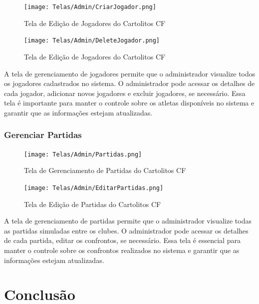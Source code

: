 \documentclass[12pt]{article}
\begin{document}
\begin{figure}[H]
  \centering
  \texttt{[image: Telas/Admin/CriarJogador.png]}
  \caption{Tela de Edição de Jogadores do Cartolitos CF}
  \label{fig:editar_jogador}
\end{figure}

\begin{figure}[H]
  \centering
  \texttt{[image: Telas/Admin/DeleteJogador.png]}
  \caption{Tela de Edição de Jogadores do Cartolitos CF}
  \label{fig:editar_jogador2}
\end{figure}
A tela de gerenciamento de jogadores permite que o administrador visualize todos os jogadores cadastrados no sistema. O administrador pode acessar os detalhes de cada jogador, adicionar novos jogadores e excluir jogadores, se necessário. Essa tela é importante para manter o controle sobre os atletas disponíveis no sistema e garantir que as informações estejam atualizadas.

\subsubsection{Gerenciar Partidas}
\label{sec:gerenciar_partidas}
\begin{figure}[H]
  \centering
  \texttt{[image: Telas/Admin/Partidas.png]}
  \caption{Tela de Gerenciamento de Partidas do Cartolitos CF}
  \label{fig:gerenciar_partidas}
\end{figure}

\begin{figure}[H]
  \centering
  \texttt{[image: Telas/Admin/EditarPartidas.png]}
  \caption{Tela de Edição de Partidas do Cartolitos CF}
  \label{fig:editar_partida}
\end{figure}

A tela de gerenciamento de partidas permite que o administrador visualize todas as partidas simuladas entre os clubes. O administrador pode acessar os detalhes de cada partida, editar os confrontos, se necessário. Essa tela é essencial para manter o controle sobre os confrontos realizados no sistema e garantir que as informações estejam atualizadas.

\section{Conclusão}
\label{sec:conclusao}
\end{document}

